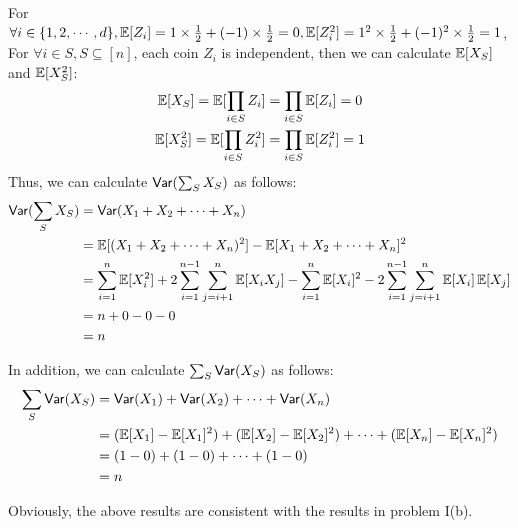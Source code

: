 \begin{problem}[30 points]
\begin{enumerate}[(a)]
For $\forall i \in \{1, 2, \cdots, d\}, \operatorname*{\mathbb{E}}[Z_i] = 1 \times \frac{1}{2} + (-1) \times \frac{1}{2} = 0, \operatorname*{\mathbb{E}}[Z_i^2] = 1^2 \times \frac{1}{2} + (-1)^2 \times \frac{1}{2} = 1$, \\
For $\forall i \in S, S \subseteq [n]$, each coin $Z_i$ is independent, then we can calculate $\operatorname*{\mathbb{E}}[X_S]$ and $\operatorname*{\mathbb{E}}[X_S^2]$:
\begin{gather*}
\operatorname*{\mathbb{E}}[X_S] = \operatorname*{\mathbb{E}}[\prod_{i \in S}Z_i] = \prod_{i \in S}\operatorname*{\mathbb{E}}[Z_i] = 0 \notag \\
\operatorname*{\mathbb{E}}[X_S^2] = \operatorname*{\mathbb{E}}[\prod_{i \in S}Z_i^2] = \prod_{i \in S}\operatorname*{\mathbb{E}}[Z_i^2] = 1 \notag \\
\end{gather*}
Thus, we can calculate $\mathsf{Var}(\sum_{S}X_S)$ as follows:
\begin{equation}
\begin{aligned}
\mathsf{Var}(\sum_{S}X_S) &= \mathsf{Var}(X_1 + X_2 + \cdots + X_n) \notag \\
&= \operatorname*{\mathbb{E}}[(X_1 + X_2 + \cdots + X_n)^2] - \operatorname*{\mathbb{E}}[X_1 + X_2 + \cdots + X_n]^2 \\
&= \sum_{i=1}^n\operatorname*{\mathbb{E}}[X_i^2] + 2\sum_{i=1}^{n-1}\sum_{j=i+1}^{n}\operatorname*{\mathbb{E}}[X_iX_j] - \sum_{i=1}^n\operatorname*{\mathbb{E}}[X_i]^2 - 2\sum_{i=1}^{n-1}\sum_{j=i+1}^{n}\operatorname*{\mathbb{E}}[X_i]\operatorname*{\mathbb{E}}[X_j] \\
&= n + 0 - 0 - 0 \\
&= n
\end{aligned}
\end{equation}

In addition, we can calculate $\sum_{S}\mathsf{Var}(X_S)$ as follows:
\begin{equation}
\begin{aligned}
\sum_{S}\mathsf{Var}(X_S) &= \mathsf{Var}(X_1) + \mathsf{Var}(X_2) + \cdots + \mathsf{Var}(X_n) \notag \\
&= (\operatorname*{\mathbb{E}}[X_1] - \operatorname*{\mathbb{E}}[X_1]^2) + (\operatorname*{\mathbb{E}}[X_2] - \operatorname*{\mathbb{E}}[X_2]^2) + \cdots + (\operatorname*{\mathbb{E}}[X_n] - \operatorname*{\mathbb{E}}[X_n]^2) \\
&= (1 - 0) + (1 - 0) + \cdots + (1 - 0) \\
&= n
\end{aligned}
\end{equation}

Obviously, the above results are consistent with the results in problem I(b).

\end{enumerate}
\end{problem}

~\\

